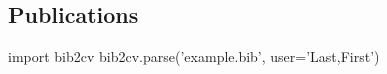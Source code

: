 \documentclass[12pt,]{article}
\begin{document}
\subsection{Publications}\label{publications}

\begin{python}

import bib2cv
bib2cv.parse('example.bib', user='Last,First')

\end{python}
\end{document}
